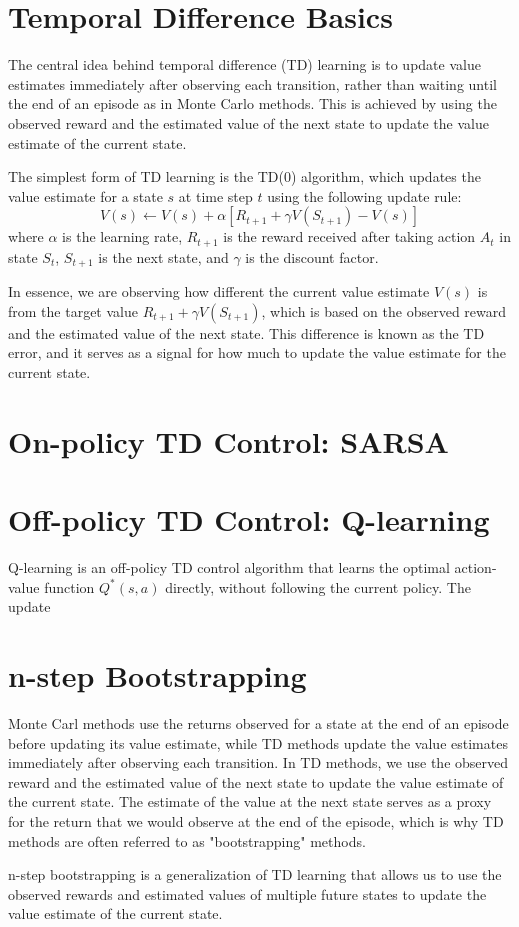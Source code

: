 \documentclass{article}
\begin{document}
\section{Temporal Difference Basics}
\quad The central idea behind temporal difference (TD) learning is to update value estimates immediately after observing each transition, 
rather than waiting until the end of an episode as in Monte Carlo methods. This is achieved by using the observed reward and the estimated value of the next state to update the 
value estimate of the current state. 

The simplest form of TD learning is the TD(0) algorithm, which updates the value estimate for a state \( s \) at time step \( t \) using the following update rule:
\begin{equation}
V(s) \leftarrow V(s) + \alpha [R_{t+1} + \gamma V(S_{t+1}) - V(s)]
\end{equation}
where \( \alpha \) is the learning rate, \( R_{t+1} \) is the reward received after taking action \( A_t \) in state \( S_t \), \( S_{t+1} \) is the next state, 
and \( \gamma \) is the discount factor.

In essence, we are observing how different the current value estimate \( V(s) \) is from the target value \( R_{t+1} + \gamma V(S_{t+1}) \), which is based on the observed reward and the estimated value of the next state.
This difference is known as the TD error, and it serves as a signal for how much to update the value estimate for the current state.

\section{On-policy TD Control: SARSA}

\section{Off-policy TD Control: Q-learning}
\quad Q-learning is an off-policy TD control algorithm that learns the optimal action-value function \( Q^*(s, a) \) directly, without following the current policy. 
The update


\section{n-step Bootstrapping}
\quad Monte Carl methods use the returns observed for a state at the end of an episode before updating its value estimate, while TD methods update the value estimates immediately after observing each transition.
In TD methods, we use the observed reward and the estimated value of the next state to update the value estimate of the current state. The estimate of the value at the next state serves as a proxy 
for the return that we would observe at the end of the episode, which is why TD methods are often referred to as "bootstrapping" methods.

n-step bootstrapping is a generalization of TD learning that allows us to use the observed rewards and estimated values of multiple future states to update the value estimate of the current state.
\end{document}
